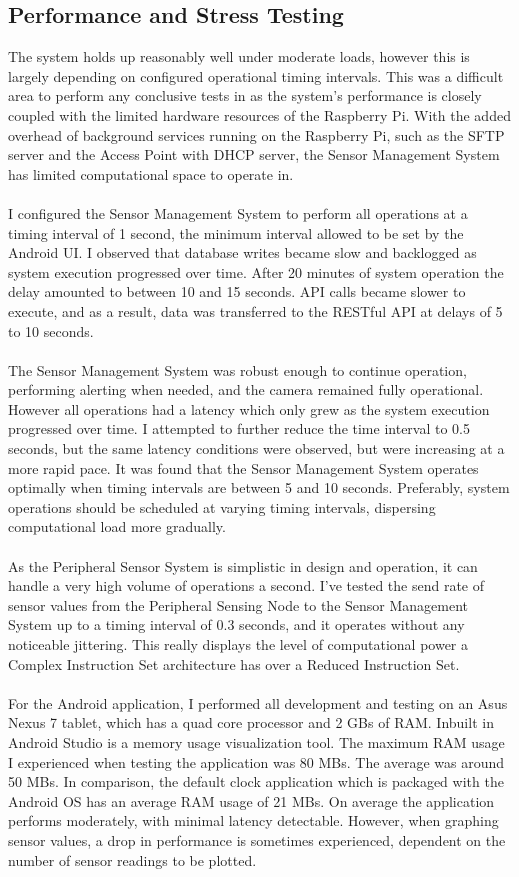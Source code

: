 \documentclass{article}
\begin{document}
\subsection{Performance and Stress Testing}
The system holds up reasonably well under moderate loads, however this is largely  depending on configured operational timing intervals. This was a difficult area to perform any conclusive tests in as the system\rq s performance is closely coupled with the limited hardware resources of the Raspberry Pi. With the added overhead of background services running on the Raspberry Pi, such as the SFTP server and the Access Point with DHCP server, the Sensor Management System has limited computational space to operate in. 
\\\\
I configured the Sensor Management System to perform all operations at a timing interval of 1 second, the minimum interval allowed to be set by the Android UI. I observed that database writes became slow and backlogged as system execution progressed over time. After 20 minutes of system operation the delay amounted to between 10 and 15 seconds. API calls became slower to execute, and as a result, data was transferred to the RESTful API at delays of 5 to 10 seconds. \\\\
The Sensor Management System was robust enough to continue operation, performing alerting when needed, and the camera remained fully operational. However all operations had a latency which only grew as the system execution progressed over time. I attempted to further reduce the time interval to 0.5 seconds, but the same latency conditions were observed, but were increasing at a more rapid pace. It was found that the Sensor Management System operates optimally when timing intervals are between 5 and 10 seconds. Preferably, system operations should be scheduled at varying timing intervals, dispersing computational load more gradually. \\\\
As the Peripheral Sensor System is simplistic in design and operation, it can handle a very high volume of operations a second. I’ve tested the send rate of sensor values from the Peripheral Sensing Node to the Sensor Management System up to a timing interval of 0.3 seconds, and it operates without any noticeable jittering. This really displays the level of computational power a Complex Instruction Set architecture has over a Reduced Instruction Set. \\\\
For the Android application, I performed all development and testing on an Asus Nexus 7 tablet, which has a quad core processor and 2 GBs of RAM. Inbuilt in Android Studio is a memory usage visualization tool. The maximum RAM usage I experienced when testing the application was 80 MBs. The average was around 50 MBs. In comparison, the default clock application which is packaged with the Android OS has an average RAM usage of 21 MBs. On average the application performs moderately, with minimal latency detectable. However, when graphing sensor values, a drop in performance is sometimes experienced, dependent on the number of sensor readings to be plotted. 
\end{document}
